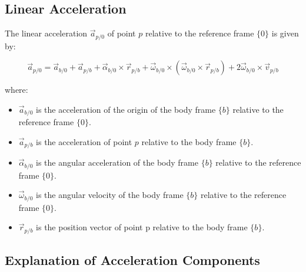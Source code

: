 \subsection{Linear Acceleration}

The linear acceleration \( \vec{a}_{p/0} \) of point \( p \) relative to the reference frame \( \{0\} \) is given by:

\[
\vec{a}_{p/0} = \vec{a}_{b/0} + \vec{a}_{p/b} + \vec{\alpha}_{b/0} \times \vec{r}_{p/b} + \vec{\omega}_{b/0} \times (\vec{\omega}_{b/0} \times \vec{r}_{p/b}) + 2 \vec{\omega}_{b/0} \times \vec{v}_{p/b}
\]

where:
\begin{itemize}
    \item \( \vec{a}_{b/0} \) is the acceleration of the origin of the body frame \( \{b\} \) relative to the reference frame \( \{0\} \).
    \item \( \vec{a}_{p/b} \) is the acceleration of point \( p \) relative to the body frame \( \{b\} \).
    \item \( \vec{\alpha}_{b/0} \) is the angular acceleration of the body frame \( \{b\} \) relative to the reference frame \( \{0\} \).
    \item \( \vec{\omega}_{b/0} \) is the angular velocity of the body frame \( \{b\} \) relative to the reference frame \( \{0\} \).
    \item \( \vec{r}_{p/b} \) is the position vector of point p relative to the body frame \( \{b\} \).
\end{itemize}

\subsection{Explanation of Acceleration Components}

